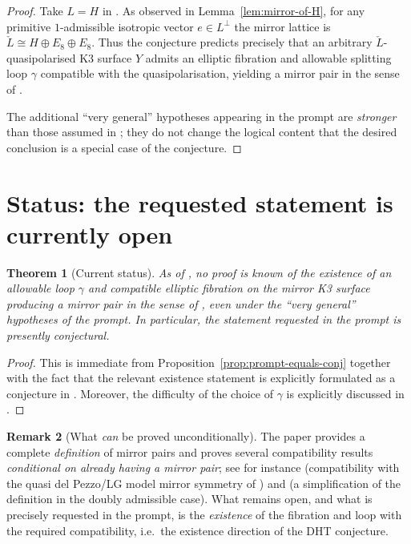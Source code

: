 \documentclass[11pt]{amsart}
\newtheorem{theorem}{Theorem}[section]
\theoremstyle{definition}
\newtheorem{remark}[theorem]{Remark}
\begin{document}
\begin{proof}
Take $L=H$ in \cite[Conjecture~5.10]{dfk3slpms}.
As observed in Lemma~\ref{lem:mirror-of-H}, for any primitive $1$-admissible isotropic vector $e\in L^\perp$ the mirror
lattice is $\check L\cong H\oplus E_8\oplus E_8$.
Thus the conjecture predicts precisely that an arbitrary $\check L$-quasipolarised K3 surface $Y$ admits an elliptic
fibration and allowable splitting loop $\gamma$ compatible with the quasipolarisation, yielding a mirror pair in the
sense of \cite[Definition~5.1]{dfk3slpms}.

The additional ``very general'' hypotheses appearing in the prompt are \emph{stronger} than those assumed in
\cite[Conjecture~5.10]{dfk3slpms}; they do not change the logical content that the desired conclusion is a special case
of the conjecture.
\end{proof}

\section{Status: the requested statement is currently open}

\begin{theorem}[Current status]\label{thm:status}
As of \cite{dfk3slpms}, no proof is known of the existence of an allowable loop $\gamma$ and compatible elliptic fibration
on the mirror K3 surface producing a mirror pair in the sense of \cite[Definition~5.1]{dfk3slpms}, even under the ``very
general'' hypotheses of the prompt. In particular, the statement requested in the prompt is presently conjectural.
\end{theorem}

\begin{proof}
This is immediate from Proposition~\ref{prop:prompt-equals-conj} together with the fact that the relevant existence
statement is explicitly formulated as a conjecture in \cite[Conjecture~5.10]{dfk3slpms}. Moreover, the difficulty of the
choice of $\gamma$ is explicitly discussed in \cite[Remark~5.11]{dfk3slpms}.
\end{proof}

\begin{remark}[What \emph{can} be proved unconditionally]
The paper \cite{dfk3slpms} provides a complete \emph{definition} of mirror pairs
\cite[Definition~5.1]{dfk3slpms} and proves several compatibility results \emph{conditional on already having a mirror
pair}; see for instance \cite[Theorem~5.4]{dfk3slpms} (compatibility with the quasi del Pezzo/LG model mirror symmetry
of \cite{HT20}) and \cite[Proposition~5.3]{dfk3slpms} (a simplification of the definition in the doubly admissible case).
What remains open, and what is precisely requested in the prompt, is the \emph{existence} of the fibration and loop with
the required compatibility, i.e.\ the existence direction of the DHT conjecture.
\end{remark}
\end{document}
